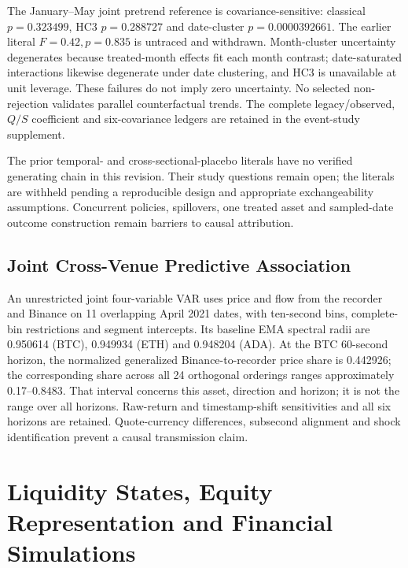 The January--May joint pretrend reference is covariance-sensitive: classical $p=0.323499$, HC3 $p=0.288727$ and date-cluster $p=0.0000392661$. The earlier literal $F=0.42,p=0.835$ is untraced and withdrawn. Month-cluster uncertainty degenerates because treated-month effects fit each month contrast; date-saturated interactions likewise degenerate under date clustering, and HC3 is unavailable at unit leverage. These failures do not imply zero uncertainty. No selected non-rejection validates parallel counterfactual trends. The complete legacy/observed, $Q/S$ coefficient and six-covariance ledgers are retained in the event-study supplement.

The prior temporal- and cross-sectional-placebo literals have no verified generating chain in this revision. Their study questions remain open; the literals are withheld pending a reproducible design and appropriate exchangeability assumptions. Concurrent policies, spillovers, one treated asset and sampled-date outcome construction remain barriers to causal attribution.


\subsection{Joint Cross-Venue Predictive Association}
\label{sec:cross_venue_verified}
An unrestricted joint four-variable VAR uses price and flow from the recorder and Binance on 11 overlapping April 2021 dates, with ten-second bins, complete-bin restrictions and segment intercepts. Its baseline EMA spectral radii are 0.950614 (BTC), 0.949934 (ETH) and 0.948204 (ADA). At the BTC 60-second horizon, the normalized generalized Binance-to-recorder price share is 0.442926; the corresponding share across all 24 orthogonal orderings ranges approximately 0.17--0.8483. That interval concerns this asset, direction and horizon; it is not the range over all horizons. Raw-return and timestamp-shift sensitivities and all six horizons are retained. Quote-currency differences, subsecond alignment and shock identification prevent a causal transmission claim.

\section{Liquidity States, Equity Representation and Financial Simulations}
\label{sec:stress_fragility}
